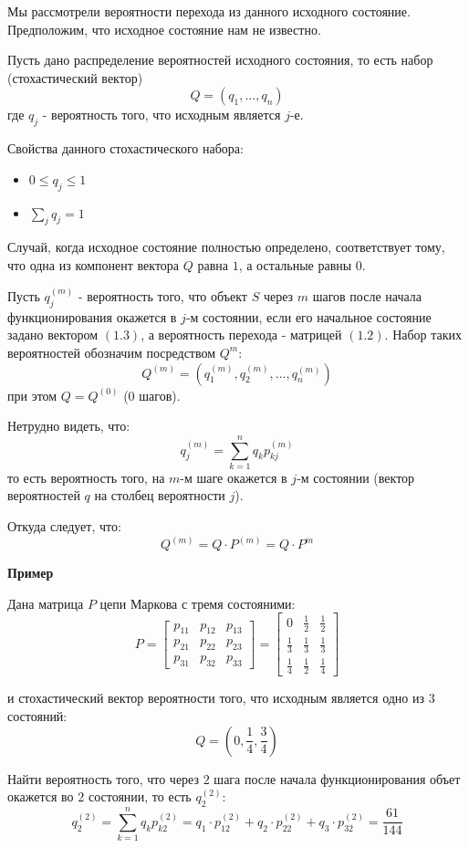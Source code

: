 \documentclass[aps,%
12pt,%
final,%
oneside,
onecolumn,%
musixtex, %
superscriptaddress,%
centertags]{article} %
\theoremstyle{plain}
\theoremstyle{definition}
\theoremstyle{remark}
\begin{document}
Мы рассмотрели вероятности перехода из данного исходного состояние. Предположим, что исходное состояние нам не известно.

Пусть дано распределение вероятностей исходного состояния, то есть набор (стохастический вектор)
$$Q = (q_1,\ldots,q_n)$$
где $q_j$ - вероятность того, что исходным является $j$-е.

Свойства данного стохастического набора:
\begin{itemize}
	\item $0\leq q_j \leq 1$
	\item $\sum\limits_j q_j = 1$
\end{itemize}

Случай, когда исходное состояние полностью определено, соответствует тому, что одна из компонент вектора $Q$ равна $1$, а остальные равны $0$.

Пусть $q_j^{(m)}$ - вероятность того, что объект $S$ через $m$ шагов после начала функционирования окажется в $j$-м состоянии, если его начальное состояние задано вектором $(1.3)$, а вероятность перехода - матрицей $(1.2)$. Набор таких вероятностей обозначим посредством $Q^m$:
$$Q^{(m)} = (q_1^{(m)},q_2^{(m)},\ldots,q_n^{(m)})$$
при этом $Q = Q^{(0)}$ (0 шагов).

Нетрудно видеть, что:
$$q_j^{(m)} = \sum\limits_{k=1}^n q_kp_{kj}^{(m)}$$
то есть вероятность того, на $m$-м шаге окажется в $j$-м состоянии (вектор вероятностей $q$ на столбец вероятности $j$).

Откуда следует, что:
$$Q^{(m)} = Q \cdot P^{(m)}  = Q \cdot P^m$$

\textbf{Пример}

Дана матрица $P$ цепи Маркова с тремя состояними:
$$P = \begin{bmatrix}
	p_{11} & p_{12} & p_{13} \\
	p_{21} & p_{22} & p_{23} \\
	p_{31} & p_{32} & p_{33}
\end{bmatrix} = \begin{bmatrix}
	0 & \frac{1}{2} & \frac{1}{2} \\
	\frac{1}{3} & \frac{1}{3} & \frac{1}{3} \\
	\frac{1}{4} & \frac{1}{2} & \frac{1}{4}
\end{bmatrix}$$

и стохастический вектор вероятности того, что исходным является одно из $3$ состояний:
$$Q = \left(0,\frac{1}{4},\frac{3}{4}\right)$$

Найти вероятность того, что через $2$ шага после начала функционирования объет окажется во $2$ состоянии, то есть $q_2^{(2)}$:
$$q_2^{(2)} = \sum\limits_{k=1}^n q_kp_{k2}^{(2)} = q_1\cdot p_{12}^{(2)} +  q_2\cdot p_{22}^{(2)} + q_3\cdot p_{32}^{(2)} = \frac{61}{144}$$
\end{document}
